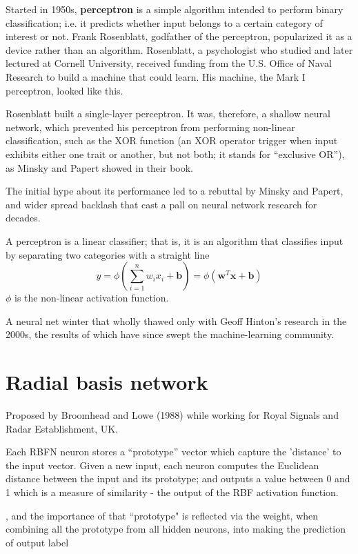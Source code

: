 Started in 1950s, {\bf perceptron} is a simple algorithm intended to perform
binary classification; i.e. it predicts whether input belongs to a certain
category of interest or not.
Frank Rosenblatt, godfather of the perceptron, popularized it as a device rather
than an algorithm. Rosenblatt, a psychologist who studied and later lectured at
Cornell University, received funding from the U.S. Office of Naval Research to
build a machine that could learn. His machine, the Mark I perceptron, looked
like this. 


Rosenblatt built a single-layer perceptron. It was, therefore, a shallow neural
network, which prevented his perceptron from performing non-linear
classification, such as the XOR function (an XOR operator trigger when input
exhibits either one trait or another, but not both; it stands for “exclusive
OR”), as Minsky and Papert showed in their book.

The initial hype about its performance led to a rebuttal by Minsky and Papert,
and wider spread backlash that cast a pall on neural network research for
decades.

A perceptron is a linear classifier; that is, it is an algorithm that classifies
input by separating two categories with a straight line
\begin{equation}
y = \phi \left( \sum_{i=1}^n w_i x_i + \mathbf{b} \right) = \phi\left( \mathbf{w}^T \mathbf{x} + \mathbf{b} \right)
\end{equation}
$\phi$ is the non-linear activation function.

A neural net winter that wholly thawed only with Geoff Hinton’s research in the
2000s, the results of which have since swept the machine-learning community.



\section{Radial basis network}
\label{sec:radial-basis-network}

Proposed by Broomhead and Lowe (1988) while working for  Royal Signals and Radar
Establishment, UK.

Each RBFN neuron stores a “prototype” vector which capture the 'distance' to the
input vector. Given a new input, each neuron computes the Euclidean distance
between the input and its prototype; and outputs a value between 0 and 1 which
is a measure of similarity - the output of the RBF activation function.

, and the importance of that ``prototype" is reflected via the
weight, when combining all the prototype from all hidden neurons, into making
the prediction of output label


